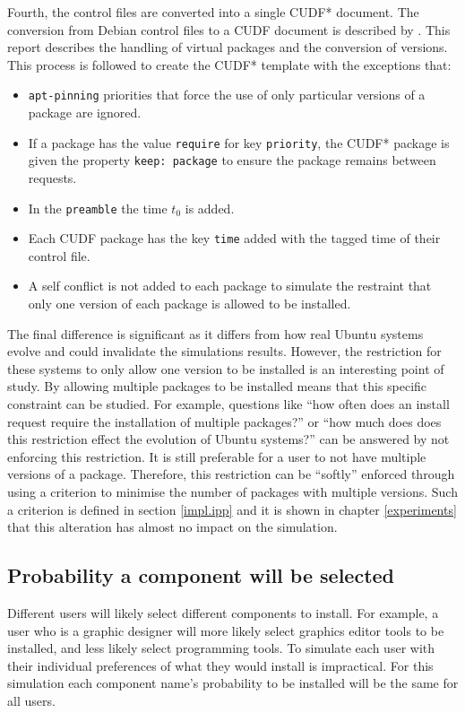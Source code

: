 Fourth, the control files are converted into a single CUDF* document.
The conversion from Debian control files to a CUDF document is described by \cite{abatetrenen2010}.
This report describes the handling of virtual packages and the conversion of versions. 
This process is followed to create the CUDF* template with the exceptions that:
\begin{itemize}
  \item \texttt{apt-pinning} priorities that force the use of only particular versions of a package are ignored.
  \item If a package has the value \texttt{require} for key \texttt{priority}, the CUDF* package is given the property \texttt{keep: package} to ensure the package remains between requests.
  \item In the \texttt{preamble} the time $t_0$ is added.
  \item Each CUDF package has the key \texttt{time} added with the tagged time of their control file.
  \item A self conflict is not added to each package to simulate the restraint that only one version of each package is allowed to be installed.
\end{itemize} 
The final difference is significant as it differs from how real Ubuntu systems evolve and could invalidate the simulations results.
However, the restriction for these systems to only allow one version to be installed is an interesting point of study.
By allowing multiple packages to be installed means that this specific constraint can be studied.
For example, questions like ``how often does an install request require the installation of multiple packages?'' 
or ``how much does does this restriction effect the evolution of Ubuntu systems?'' can be answered by not enforcing this restriction.
It is still preferable for a user to not have multiple versions of a package.
Therefore, this restriction can be ``softly'' enforced through using a criterion to minimise the number of packages with multiple versions.
Such a criterion is defined in section \ref{impl.ipp} and it is shown in chapter \ref{experiments} that this alteration has almost no impact on the simulation.

\subsection{Probability a component will be selected}
Different users will likely select different components to install.
For example, a user who is a graphic designer will more likely select graphics editor tools to be installed, and less likely select programming tools.
To simulate each user with their individual preferences of what they would install is impractical.
For this simulation each component name's probability to be installed will be the same for all users.


